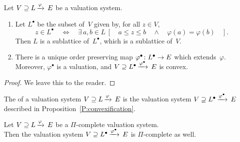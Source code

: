 %
%
\begin{prop}
\label{P:convex-completion}
\label{P:convexification}
Let $V \supseteq L\,\smash{\xrightarrow{\varphi}\,E}$ be a valuation system.
\begin{enumerate}
\item
Let $L^\bullet$ be the subset of~$V$ given by,
for all $z\in V$,
\begin{equation*}
z\in L^\bullet \quad\iff\quad
\exists\, a,b\in L\ [
\quad a\leq z\leq b \quad\wedge\quad \varphi(a) = \varphi(b)\quad].
\end{equation*}
Then $L$ is a sublattice of~$L^\bullet$, which is a sublattice of~$V$.

\item
There is a unique order preserving map $\varphi^\bullet\colon L^\bullet\rightarrow E$
which extends~$\varphi$.\\
Moreover, $\varphi^\bullet$
is a valuation,
and  $V \supseteq L^\bullet\,\smash{\xrightarrow{\varphi^\bullet}\,E}$ is convex.
\end{enumerate}
\end{prop}
\begin{proof}
We leave this to the reader.
\end{proof}
\begin{dfn}
\label{D:convexification}
The 
of a valuation system $V \supseteq L\,\smash{\xrightarrow{\varphi}\,E}$ 
is the valuation system
 $V \supseteq L^\bullet\,\smash{\xrightarrow{\varphi^\bullet}\,E}$ 
described in Proposition~\ref{P:convexification}.
\end{dfn}
%
%
\begin{prop}
\label{P:convexification_versus_pi-completion}
Let $V \supseteq L\,\smash{\xrightarrow{\varphi}\,E}$ be a $\Pi$-complete valuation system.\\
Then 
the valuation system 
$V \supseteq L^\bullet\,\smash{\xrightarrow{\varphi^\bullet}\,E}$ is $\Pi$-complete as well.
\end{prop}

